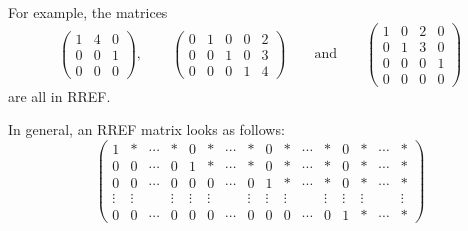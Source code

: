 \documentclass[10pt, a4paper]{article}
\begin{document}
For example, the matrices
\[
\begin{pmatrix}
    1 & 4 & 0 \\ 0 & 0 & 1 \\ 0 & 0 & 0
\end{pmatrix},
\qquad
\begin{pmatrix}
    0 & 1 & 0 & 0 & 2 \\ 0 & 0 & 1 & 0 & 3 \\ 0 & 0 & 0 & 1 & 4
\end{pmatrix}
\qquad\text{and}
\qquad
\begin{pmatrix}
    1 & 0 & 2 & 0 \\
    0 & 1 & 3 & 0 \\
    0 & 0 & 0 & 1 \\
    0 & 0 & 0 & 0
\end{pmatrix}
\]
are all in RREF.

In general, an RREF matrix looks as follows:
\[
\left(
\begin{array}{cccccccccccccccc}
    1 & * & \dotsi & * & 0 & * & \dotsi & * & 0 & * & \dotsi & * & 0 & * & \dotsi & * \\
    0 & 0 & \dotsi & 0 & 1 & * & \dotsi & * & 0 & * & \dotsi & * & 0 & * & \dotsi & * \\
    0 & 0 & \dotsi & 0 & 0 & 0 & \dotsi & 0 & 1 & * & \dotsi & * & 0 & * & \dotsi & * \\
    \vdots & \vdots & \phantom{} & \vdots & \vdots & \vdots & \phantom{} & \vdots & \vdots & \vdots & \phantom{} & \vdots & \vdots & \vdots & \phantom{} & \vdots \\
    0 & 0 & \dotsi & 0 & 0 & 0 & \dotsi & 0 & 0 & 0 & \dotsi & 0 & 1 & * & \dotsi & *
\end{array}
\right)
\]
\end{document}
